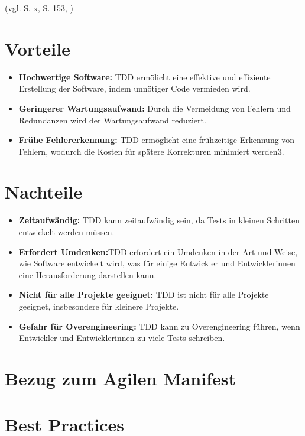 \documentclass[a0,landscape]{a0poster}
\begin{document}
\begin{multicols}{4}
(vgl. \cite{beck_test_2022} S. x, \cite{schatten_qualitatssicherung_2010} S. 153, \cite{ionos_test_2020})


\section*{Vorteile}

\begin{itemize}
    \item \textbf{Hochwertige Software:} TDD ermölicht eine effektive und effiziente Erstellung der Software, indem unnötiger Code vermieden wird.
    \item \textbf{Geringerer Wartungsaufwand:} Durch die Vermeidung von Fehlern und Redundanzen wird der Wartungsaufwand reduziert.
    \item \textbf{Frühe Fehlererkennung:} TDD ermöglicht eine frühzeitige Erkennung von Fehlern, wodurch die Kosten für spätere Korrekturen minimiert werden3.
\end{itemize}

\section*{Nachteile}
\begin{itemize}
    \item \textbf{Zeitaufwändig:} TDD kann zeitaufwändig sein, da Tests in kleinen Schritten entwickelt werden müssen.
    \item \textbf{Erfordert Umdenken:}TDD erfordert ein Umdenken in der Art und Weise, wie Software entwickelt wird, was für einige Entwickler und Entwicklerinnen eine Herausforderung darstellen kann.
    \item \textbf{Nicht für alle Projekte geeignet:} TDD ist nicht für alle Projekte geeignet, insbesondere für kleinere Projekte.
    \item \textbf{Gefahr für Overengineering:} TDD kann zu Overengineering führen, wenn Entwickler und Entwicklerinnen zu viele Tests schreiben.
\end{itemize}

\section*{Bezug zum Agilen Manifest}

\section*{Best Practices}


\end{multicols}
\end{document}
